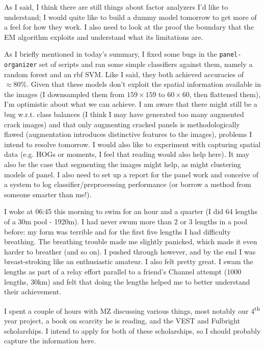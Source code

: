 \documentclass[idxtotoc,hyperref,openany]{labbook} %
\begin{document}
 As I said, I think there are still things about factor analyzers I'd like to understand; I would quite like to build a dummy model tomorrow to get more of a feel for how they work. I also need to look at the proof the boundary that the EM algorithm exploits and understand what its limitations are.
 
 As I briefly mentioned in today's summary, I fixed some bugs in the \texttt{panel-organizer} set of scripts and ran some simple classifiers against them, namely a random forest and an rbf SVM. Like I said, they both achieved accuracies of $\approx80\%$. Given that these models don't exploit the spatial information available in the images (I downsampled them  from $159 \times 159$ to $60 \times 60$, then flattened them), I'm optimistic about what we can achieve. I am aware that there might still be a bug w.r.t. class balances (I think I may have generated too many augmented crack images) and that only augmenting cracked panels is methodologically flawed (augmentation introduces distinctive features to the images), problems I intend to resolve tomorrow. I would also like to experiment with capturing spatial data (e.g. HOGs or moments, I feel that reading would also help here). It may also be the case that segmenting the images might help, as might clustering models of panel. I also need to set up a report for the panel work and conceive of a system to log classifier/preprocessing performance (or borrow a method from someone smarter than me!).
 
 
 
 I woke at 06:45 this morning to swim for an hour and a quarter (I did 64 lengths of a 30m pool - 1920m). I had never swum more than 2 or 3 lengths in a pool before: my form was terrible and for the first five lengths I had difficulty breathing. The breathing trouble made me slightly panicked, which made it even harder to breather (and so on). I pushed through however, and by the end I was breast-stroking like an enthusiastic amateur. I also felt pretty great. I swam the lengths as part of a relay effort parallel to a friend's Channel attempt (1000 lengths, 30km) and felt that doing the lengths helped me to better understand their achievement.
 
 I spent a couple of hours with MZ discussing various things, most notably our 4\textsuperscript{th} year project, a book on scarcity he is reading, and the VEST and Fulbright scholarships. I intend to apply for both of these scholarships, so I should probably capture the information here.
 
\end{document}
